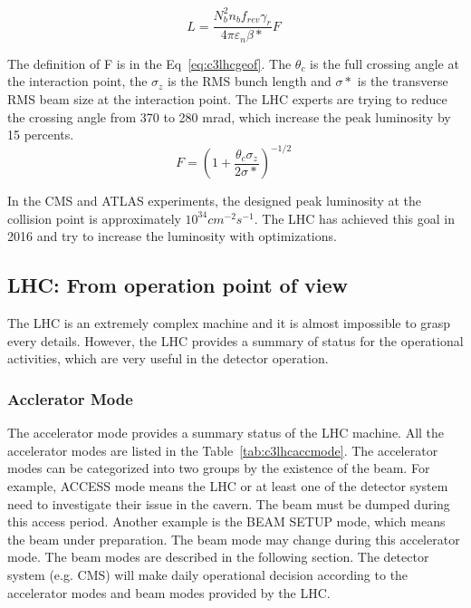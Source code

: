 \begin{equation}
 L = \frac{N^{2}_{b}n_{b}f_{rev}\gamma_{r}}{4\pi \varepsilon_{n}\beta *}F \;
 \label{eq:c3lhclumi}
\end{equation}

The definition of F is in the Eq~\ref{eq:c3lhcgeof}. The $\theta_{c}$ is the full crossing angle at the interaction point, the $\sigma_{z}$ is the RMS bunch length and $\sigma *$ is the transverse RMS beam size at the interaction point. The LHC experts are trying to reduce the crossing angle from 370 to 280 mrad, which increase the peak luminosity by 15 percents. 
\begin{equation}
 F = (1+\frac{\theta_{c}\sigma_{z}}{2\sigma *})^{-1/2} \;
 \label{eq:c3lhcgeof}
\end{equation}

In the CMS and ATLAS experiments, the designed peak luminosity at the collision point is approximately $10^{34}cm^{-2}s^{-1}$. The LHC has achieved this goal in 2016 and try to increase the luminosity with optimizations.

\clearpage
\subsection{LHC: From operation point of view}

The LHC is an extremely complex machine and it is almost impossible to grasp every details. However, the LHC provides a summary of status for the operational activities, which are very useful in the detector operation.

\subsubsection{Acclerator Mode}

The accelerator mode provides a summary status of the LHC machine. All the accelerator modes are listed in the Table~\ref{tab:c3lhcaccmode}. The accelerator modes can be categorized into two groups by the existence of the beam. For example, ACCESS mode means the LHC or at least one of the detector system need to investigate their issue in the cavern. The beam must be dumped during this access period. Another example is the BEAM SETUP mode, which means the beam under preparation. The beam mode may change during this accelerator mode. The beam modes are described in the following section. The detector system (e.g. CMS) will make daily operational decision according to the accelerator modes and beam modes provided by the LHC.

